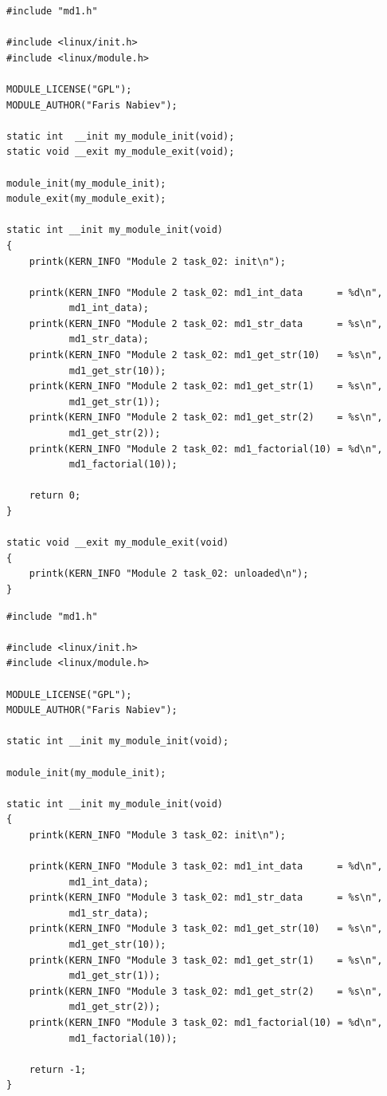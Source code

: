 \begin{lstlisting}[caption={md2.c}]
#include "md1.h"

#include <linux/init.h>
#include <linux/module.h>

MODULE_LICENSE("GPL");
MODULE_AUTHOR("Faris Nabiev");

static int  __init my_module_init(void);
static void __exit my_module_exit(void);

module_init(my_module_init);
module_exit(my_module_exit);

static int __init my_module_init(void)
{
    printk(KERN_INFO "Module 2 task_02: init\n");

    printk(KERN_INFO "Module 2 task_02: md1_int_data      = %d\n",
           md1_int_data);
    printk(KERN_INFO "Module 2 task_02: md1_str_data      = %s\n",
           md1_str_data);
    printk(KERN_INFO "Module 2 task_02: md1_get_str(10)   = %s\n",
           md1_get_str(10));
    printk(KERN_INFO "Module 2 task_02: md1_get_str(1)    = %s\n",
           md1_get_str(1));
    printk(KERN_INFO "Module 2 task_02: md1_get_str(2)    = %s\n",
           md1_get_str(2));
    printk(KERN_INFO "Module 2 task_02: md1_factorial(10) = %d\n",
           md1_factorial(10));

    return 0;
}

static void __exit my_module_exit(void)
{
    printk(KERN_INFO "Module 2 task_02: unloaded\n");
}
\end{lstlisting}
\begin{lstlisting}[caption={md3.c}]
#include "md1.h"

#include <linux/init.h>
#include <linux/module.h>

MODULE_LICENSE("GPL");
MODULE_AUTHOR("Faris Nabiev");

static int __init my_module_init(void);

module_init(my_module_init);

static int __init my_module_init(void)
{
    printk(KERN_INFO "Module 3 task_02: init\n");

    printk(KERN_INFO "Module 3 task_02: md1_int_data      = %d\n",
           md1_int_data);
    printk(KERN_INFO "Module 3 task_02: md1_str_data      = %s\n",
           md1_str_data);
    printk(KERN_INFO "Module 3 task_02: md1_get_str(10)   = %s\n",
           md1_get_str(10));
    printk(KERN_INFO "Module 3 task_02: md1_get_str(1)    = %s\n",
           md1_get_str(1));
    printk(KERN_INFO "Module 3 task_02: md1_get_str(2)    = %s\n",
           md1_get_str(2));
    printk(KERN_INFO "Module 3 task_02: md1_factorial(10) = %d\n",
           md1_factorial(10));

    return -1;
}
\end{lstlisting}

